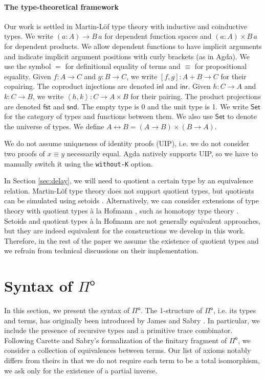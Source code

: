 \documentclass[runningheads,a4paper]{llncs}
\newcommand{\Pio}{\ensuremath{\mathsf{\Pi}^{\mathsf{o}}}}
\newcommand{\Set}{\mathsf{Set}}
\newcommand{\copair}[2]{[#1,#2]}
\newcommand{\pair}[2]{\left< #1,#2 \right>}
\newcommand{\inl}{\mathsf{inl}}
\newcommand{\inr}{\mathsf{inr}}
\newcommand{\fst}{\mathsf{fst}}
\newcommand{\snd}{\mathsf{snd}}
\begin{document}
\paragraph{The type-theoretical framework}

Our work is settled in Martin-L\"of type theory with inductive and
coinductive types. We write $(a : A) \to B \,a$ for dependent function
spaces and $(a : A) \times B \,a$ for dependent products. We allow
dependent functions to have implicit arguments and indicate implicit
argument positions with curly brackets (as in Agda). We use the
symbol $=$ for definitional equality of terms and $\equiv$ for
propositional equality. Given $f : A \to C$ and
$g : B \to C$, we write $\copair f g : A + B \to C$ for their
copairing. The coproduct injections are denoted $\inl$ and $\inr$.
Given $h : C \to A$ and $k : C \to B$, we write
$\pair h k : C \to A \times B$ for their pairing. The product
projections are denoted $\fst$ and $\snd$. The empty type is 0 and the
unit type is 1. We write $\Set$ for the category of
types and functions between them. We also use $\Set$ to denote the
universe of types.
We define $A \leftrightarrow B = (A \to B) \times (B \to A)$.

We do not assume uniqueness of identity proofs
(UIP), i.e. we do not consider two proofs of $x \equiv y$ necessarily
equal. Agda natively supports UIP, so we have to manually switch it
using the \verb|without-K| option.

In Section \ref{sec:delay}, we will need to quotient a certain type by
an equivalence relation. Martin-L\"of type theory does not support
quotient types, but quotients can be simulated using setoids
\cite{BartheCP03}. Alternatively, we can consider extensions of type theory with
quotient types \`a la Hofmann \cite{Hofmann}, such as homotopy type
theory \cite{Hott}. Setoids and quotient types \`a la
Hofmann are not generally equivalent approaches, but they are indeed
equivalent for the constructions we develop in this work. Therefore,
in the rest of the paper we assume the existence of quotient types and
we refrain from technical discussions on their implementation.


\section{Syntax of \Pio}\label{sec:syntax}

In this section, we present the syntax of \Pio. The 1-structure of
\Pio, i.e. its types and terms, has originally been introduced by James
and Sabry \cite{JamesS12}. In particular, we include the presence of
recursive types and a primitive trace combinator.  Following Carette
and Sabry's formalization of the finitary fragment of \Pio, we
consider a collection of equivalences between terms. Our list of
axioms notably differs from theirs in that we do not require each term to be
a total isomorphism, we ask only for the existence of a partial
inverse. 
\end{document}
